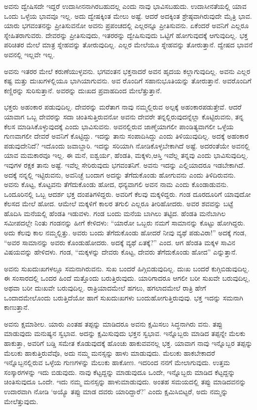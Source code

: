 ಅವನು ದ್ವೇಷಿಸದೇ ಇದ್ದರೆ ಉದಾಸೀನನಾಗಿರಬಹುದಲ್ಲ ಎಂದು ನಾವು ಭಾವಿಸಬಹುದು. ಉದಾಸೀನತೆಯಲ್ಲಿ ಯಾವ ಒಂದು ಒಳ್ಳೆಯ ಭಾವವೂ ಇಲ್ಲ. ಅದು ದ್ವೇಷಕ್ಕಿಂತ ಮೇಲು ಅಷ್ಟೆ. ಆದರೆ ಅದಕ್ಕಿಂತ ಶ್ರೇಷ್ಠವಾಗಿರುವುದೇ ಮೈತ್ರಿ ಭಾವ. ಯಾರು ಭಗವಂತನನ್ನು ಪ್ರೀತಿಸುವನೋ ಅವನು ಪ್ರಪಂಚದಲ್ಲಿ ಎಲ್ಲರನ್ನೂ ಪ್ರೀತಿಸುವನು. ಏಕೆಂದರೆ ಅವನಿಗೆ ಎಲ್ಲರೂ ಸ್ನೇಹಿತರಾಗುವರು. ದೇವರನ್ನು ಪ್ರೀತಿಸುವುದು, ಇತರರನ್ನು ದ್ವೇಷಿಸುವುದು ಒಟ್ಟಿಗೆ ಹೋಗುವುದಕ್ಕೆ ಆಗುವುದಿಲ್ಲ. ಭಕ್ತ ಪರಿಚಿತರ ಮೇಲೆ ಮಾತ್ರ ಸ್ನೇಹವನ್ನು ತೋರುವುದಿಲ್ಲ. ಎಲ್ಲರ ಮೇಲೆಯೂ ಸ್ನೇಹವನ್ನು ತೋರುತ್ತಾನೆ. ದ್ವೇಷದ ಭಾವನೆ ಅವನಲ್ಲಿ ಇಲ್ಲವೇ ಇಲ್ಲ.

ಅವನು ಇತರರ ಮೇಲೆ ಕರುಣೆಯುಳ್ಳವನು. ಭಗವಂತನ ಭಕ್ತನಾದರೆ ಅವನ ಹೃದಯ ಕಲ್ಲಾಗುವುದಿಲ್ಲ. ಅವನು ಎಲ್ಲರ ಕಷ್ಟ ಮತ್ತು ದುಃಖಗಳಲ್ಲಿಯೂ ಭಾಗಿಯಾಗುವನು. ಅವ ರೊಂದಿಗೆ ಸಹಾನುಭೂತಿಯನ್ನು ತೋರುತ್ತಾನೆ. ಅವರೊಂದಿಗೆ ಕಣ್ಣಿರನ್ನು ಸುರಿಸುತ್ತಾನೆ. ಅವರನ್ನು ದುಃಖದ ಪ್ರವಾಹದಿಂದ ಮೇಲೆತ್ತುತ್ತಾನೆ.

ಭಕ್ತರು ಅಹಂಕಾರ ಪಡುವುದಿಲ್ಲ. ದೇವರನ್ನು ಮರೆತಾಗ ನಾವು ನಮ್ಮಲ್ಲಿರುವ ಅಲ್ಪಕ್ಕೆ ಅಹಂಕಾರಪಡುತ್ತೇವೆ. ಆದರೆ ಯಾವಾಗ ಒಬ್ಬ ದೇವರನ್ನು ಸದಾ ಚಿಂತಿಸುತ್ತಿರುವನೋ ಅವನು ದೇವರೇ ತನ್ನಲ್ಲಿರುವುದನ್ನೆಲ್ಲಾ ಕೊಟ್ಟಿರುವನು, ತನ್ನ ಕೆಲಸ ಮಾಡಿಸಿಕೊಳ್ಳುವುದಕ್ಕೆ ಎಂದು ಭಾವಿಸುವನು. ಅವನಲ್ಲಿರುವ ಜಾಣ್ಮೆಯಾಗಲೀ ಪಾಂಡಿತ್ಯವಾಗಲೀ ಒಳ್ಳೆಯ ಗುಣವಾಗಲೀ ದೇವರೆ ಅವನಿಗೆ ಕೊಟ್ಟಿದ್ದು. ಇದನ್ನು ತಾನು ಸಂಪಾದಿಸಿದ್ದು ಎಂದು ತಿಳಿಯುವುದಿಲ್ಲ. ಅದಕ್ಕೆ ಅಹಂಕಾರ ಪಡುವುದೇನಿದೆ? ಇದೊಂದು ಜವಾಬ್ದಾರಿ. ಇದನ್ನು ಸರಿಯಾಗಿ ನೋಡಿಕೊಳ್ಳಬೇಕಾಗಿದೆ ಅಷ್ಟೆ. ಅದರಂತೆಯೇ ಅವನಲ್ಲಿ ಯಾವ ಮಮಕಾರವೂ ಇಲ್ಲ. ಈ ಮನೆ, ಐಶ್ವರ್ಯ, ಹೆಂಡತಿ, ಮಕ್ಕಳು,ಆಸ್ತಿ ಇವೆಲ್ಲ ತನ್ನವು ಎಂದು ಭಾವಿಸುವುದಿಲ್ಲ. ಇವುಗಳ ರಕ್ಷಕ ತಾನು ಅಷ್ಟೆ. ಇವೆಲ್ಲ ಸೇರಿರುವುದು ಭಗವಂತನಿಗೆ. ಅವನು ಇದನ್ನು ಎಲ್ಲಿಯಾದರೂ ಇಡಬೇಕಾಗಿದೆ. ಅದಕ್ಕೆ ನನ್ನಲ್ಲಿ ಇಟ್ಟಿರುವನು, ಅವನಿಚ್ಛೆ ಬಂದಾಗ ಅದನ್ನು ತೆಗೆದುಕೊಂಡು ಹೋಗುವನು ಎಂದು ತಿಳಿದಿರುವನು. ಅವನು ಕೊಟ್ಟ, ಕೊಟ್ಟವನು ತೆಗೆದುಕೊಂಡು ಹೋದ, ಧನ್ಯವಾಗಲಿ ಅವನ ನಾಮ ಎಂದು ಕೊಂಡಾಡುವನು. ಒಂದೂರಿನಲ್ಲಿ ಒಬ್ಬ ಆದರ್ಶ ಭಕ್ತ ದಂಪತಿಗಳಿದ್ದರು. ಅವರಿಗೆ ಕೆಲವು ಮಕ್ಕಳಿದ್ದರು. ಗಂಡ ದೂರದೂರಿಗೆ ಯಾವುದೋ ಕೆಲಸದ ಮೇಲೆ ಹೋದ. ಆಮೇಲೆ ಮಕ್ಕಳಿಗೆ ಕಾಲರ ತಗುಲಿ ಎಲ್ಲರೂ ತೀರಿಹೋದರು. ಅವರ ಶವವನ್ನು ಬಟ್ಟೆ ಹೊದಿಸಿ ಮನೆಯಲ್ಲಿ ಹೆಂಡತಿ ಇಡುವಳು. ಗಂಡ ಬಂದು ಮನೆಯ ಬಾಗಿಲು ತಟ್ಟಿದ. ಹೆಂಡತಿ ಮನೆಬಾಗಿಲ ಸಮೀಪದಲ್ಲೇ ನಿಂತು ಗಂಡನನ್ನು ಹೀಗೆ ಕೇಳಿದಳು: “ಯಾರೋ ಒಬ್ಬರು ನಮಗೆ ಸಾಮಾನನ್ನು ಕೊಟ್ಟು ಹೋಗಿದ್ದರು. ಅದು ಕೆಲವು ಕಾಲ ನಮ್ಮಲ್ಲಿತ್ತು. ಅವರು ಬಂದು ತೆಗೆದುಕೊಂಡು ಹೋದರೆ ನೀವು ವ್ಯಥೆ ಪಡುವಿರಾ!” ಅದಕ್ಕೆ ಗಂಡ, “ಅವರ ಸಾಮಾನನ್ನು ಅವರು ಕೊಂಡುಹೋದರು. ಅದಕ್ಕೆ ವ್ಯಥೆ ಏತಕ್ಕೆ?” ಎಂದ. ಆಗ ಹೆಂಡತಿ ಮಕ್ಕಳ ಸಾವಿನ ವಿಷಯವನ್ನು ಹೇಳಿದಳು. ಗಂಡ, “ಮಕ್ಕಳನ್ನು ದೇವರು ಕೊಟ್ಟ, ದೇವರು ತೆಗೆದುಕೊಂಡು ಹೋದ” ಎನ್ನುತ್ತಾನೆ.

ಅವನು ಸುಖದುಃಖಗಳಲ್ಲೂ ಸಮನಾಗಿರುವನು. ಸುಖ ಬಂದರೆ ಹಿಗ್ಗಿಬಿಡುವುದಿಲ್ಲ. ದುಃಖ ಬಂದರೆ ಕುಗ್ಗಿಬಿಡುವುದಿಲ್ಲ. ಈ ಸಂಸಾರದಲ್ಲಿ ಒಂದರ ಹಿಂದೆ ಮತ್ತೊಂದು ಬರುತ್ತಿರುವುದು. ಯಾರಿಗಾದರೂ ಆಗಲೀ ಬರೀ ಸುಖವೇ ಬರುವುದಿಲ್ಲ, ಅಥವಾ ಬರೀ ದುಃಖವೇ ಬರುವುದಿಲ್ಲ. ರಾತ್ರಿಯಾದಮೇಲೆ ಹಗಲು, ಹಗಲಾದಮೇಲೆ ರಾತ್ರಿ ಹೇಗೆ ಒಂದಾದಮೇಲೊಂದು ಬರುತ್ತಿದೆಯೋ ಹಾಗೆ ಸುಖದುಃಖಗಳು ಬಂದುಹೋಗುತ್ತಿರುವುವು. ಭಕ್ತ ಇದನ್ನು ಸಮನಾಗಿ ಕಾಣುತ್ತಾನೆ.

ಅವನು ಕ್ಷಮಾಶೀಲ. ಯಾರು ಎಂತಹ ತಪ್ಪನ್ನು ಮಾಡಿದರೂ ಅವನು ಕ್ಷಮಿಸಲು ಸಿದ್ಧನಾಗಿರು ವನು. ತಪ್ಪು ಮಾಡುವುದು ಮನುಷ್ಯನ ಸ್ವಭಾವ. ಅದನ್ನು ಕ್ಷಮಿಸುವುದು ಭಕ್ತನ ಸ್ವಭಾವ. ಇನ್ನೊಬ್ಬರು ಮಾಡಿದ ತಪ್ಪನ್ನೇ ಮೆಲಕು ಹಾಕುತ್ತಾ, ಅವರಿಗೆ ಬಡ್ಡಿ ಸಮೇತ ಕೊಡುವುದಕ್ಕೆ ಹೊಂಚು ಹಾಕುವವನಲ್ಲ ಭಕ್ತ. ಯಾವಾಗ ನಾವು ಇನ್ನೊಬ್ಬರ ತಪ್ಪನ್ನು ಮೆಲುಕು ಹಾಕುತ್ತಿರುವೆವೊ, ಅದು ನಮ್ಮ ಮನಸ್ಸನ್ನು ಹಾಳು ಮಾಡುವುದು. ಮೆಲುಕು ಹಾಕಬೇಕಾದರೆ ಇನ್ನೊಬ್ಬನಲ್ಲಿರುವ ಒಳ್ಳೆಯ ಗುಣಗಳನ್ನು ಮೆಲುಕು ಹಾಕೋಣ. ಇದರಿಂದ ನನಗೆ ಮೇಲಾಗುವುದು. ಉತ್ತಮ ಸಂಸ್ಕಾರಗಳನ್ನು ಇದು ಬಿಡುವುದು. ನಾವು ಕೆಟ್ಟದ್ದನ್ನು ಮಾಡುವುದೂ ಒಂದೇ, ಇನ್ನೊಬ್ಬರು ಮಾಡಿದ ಕೆಟ್ಟದ್ದನ್ನು ಚಿಂತಿಸುವುದೂ ಒಂದೇ. ಇದು ನಮ್ಮ ಮನಸ್ಸನ್ನು ಹಾಳುಮಾಡುವುದು. ಅಂತಹ ಸಮಯದಲ್ಲಿ ತಪ್ಪು ಮಾಡಿದವನನ್ನು ಉದಾರವಾಗಿ ನೋಡಿ ‘ಅಯ್ಯೊ ತಪ್ಪು ಮಾಡ ದವರು ಯಾರಿದ್ದಾರೆ?’ ಎಂದು ಕ್ಷಮಿಸಿಬಿಟ್ಟರೆ, ಅದು ನಮ್ಮನ್ನು ಮೇಲೆತ್ತುವುದು.

